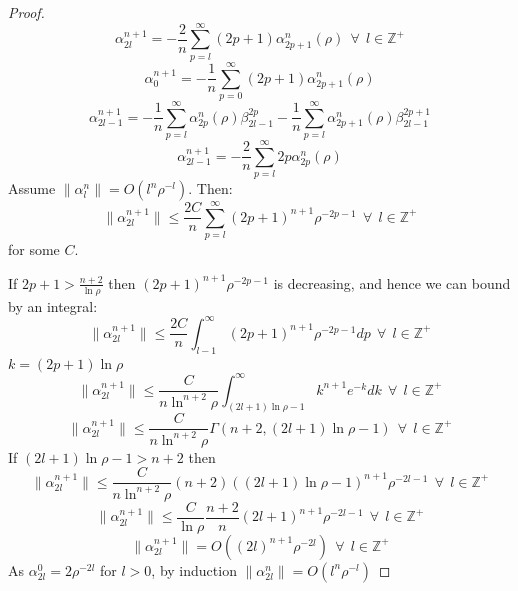 \documentclass[aps]{revtex4-2}
\begin{document}
\begin{proof}
\begin{equation}
\end{equation}
\begin{equation}
    \alpha^{n+1}_{2l} =  -\frac{2}{n} \sum_{p=l}^{\infty}(2p+1)\alpha_{2p+1}^n(\rho)  \>\>\forall \>\> l\in \mathbb{Z}^+
\end{equation}
\begin{equation}
    \alpha^{n+1}_{0} =-\frac{1}{n} \sum_{p=0}^{\infty}(2p+1)\alpha_{2p+1}^n(\rho)  
\end{equation}
\begin{equation}
    \alpha^{n+1}_{2l-1} =  -\frac{1}{n} \sum_{p=l}^{\infty}\alpha_{2p}^n(\rho)  \beta_{2l-1}^{2p}  -\frac{1}{n} \sum_{p=l}^{\infty}\alpha_{2p+1}^n(\rho)  \beta_{2l-1}^{2p+1} 
\end{equation}
\begin{equation}
    \alpha^{n+1}_{2l-1} =  -\frac{2}{n} \sum_{p=l}^{\infty}2p\alpha_{2p}^n(\rho) 
\end{equation}
Assume $\|\alpha_l^n\| = O(l^n \rho^{-l})$. Then:
\begin{equation}
    \|\alpha^{n+1}_{2l}\| \leq  \frac{2C}{n} \sum_{p=l}^{\infty}(2p+1)^{n+1} \rho^{-2p-1}  \>\>\forall \>\> l\in \mathbb{Z}^+
\end{equation}
for some $C$.

If $2p+1 > \frac{n+2}{\ln \rho}$ then $(2p+1)^{n+1} \rho^{-2p-1}$ is decreasing, and hence we can bound by an integral:
\begin{equation}
    \|\alpha^{n+1}_{2l}\| \leq  \frac{2C}{n} \int_{l-1}^{\infty} (2p+1)^{n+1} \rho^{-2p-1} dp \>\>\forall \>\> l\in \mathbb{Z}^+
\end{equation}
$k = (2p+1)\ln \rho$
\begin{equation}
    \|\alpha^{n+1}_{2l}\| \leq  \frac{C}{n\ln^{n+2} \rho} \int_{(2l+1)\ln \rho -1}^{\infty} k^{n+1} e^{-k} dk \>\>\forall \>\> l\in \mathbb{Z}^+
\end{equation}
\begin{equation}
    \|\alpha^{n+1}_{2l}\| \leq  \frac{C}{n\ln^{n+2} \rho} \Gamma(n+2,(2l+1)\ln \rho -1) \>\>\forall \>\> l\in \mathbb{Z}^+
\end{equation}
If $(2l+1)\ln \rho-1 > n+2$ then
\begin{equation}
    \|\alpha^{n+1}_{2l}\| \leq  \frac{C}{n\ln^{n+2} \rho} (n+2)((2l+1)\ln \rho-1)^{n+1} \rho^{-2l-1} \>\>\forall \>\> l\in \mathbb{Z}^+
\end{equation}
\begin{equation}
    \|\alpha^{n+1}_{2l}\| \leq  \frac{C}{\ln \rho} \frac{n+2}{n}(2l+1)^{n+1} \rho^{-2l-1} \>\>\forall \>\> l\in \mathbb{Z}^+
\end{equation}
\begin{equation}
    \|\alpha^{n+1}_{2l}\| = O((2l)^{n+1}\rho^{-2l})\>\>\forall \>\> l\in \mathbb{Z}^+
\end{equation}
As $\alpha_{2l}^0 = 2\rho^{-2l}$ for $l> 0$, by induction $\|\alpha_{2l}^n\| = O(l^n\rho^{-l})$
\end{proof}
\end{document}
